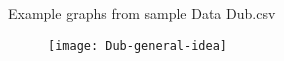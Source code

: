 \documentclass{beamer}
\theoremstyle{definition}
\theoremstyle{example}
\theoremstyle{conjecture}
\begin{document}
\begin{frame}
Example graphs from sample Data Dub.csv
\begin{figure}
\texttt{[image: Dub-general-idea]}
\end{figure}
\end{frame}




\end{document}
